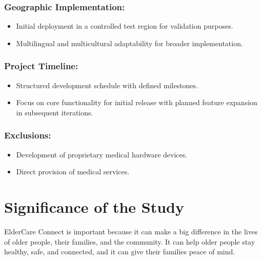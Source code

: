\subsubsection*{Geographic Implementation:}
\begin{itemize}
    \item Initial deployment in a controlled test region for validation purposes.
    \item Multilingual and multicultural adaptability for broader implementation.
\end{itemize}

\subsubsection*{Project Timeline:}
\begin{itemize}
    \item Structured development schedule with defined milestones.
    \item Focus on core functionality for initial release with planned feature expansion in subsequent iterations.
\end{itemize}

\subsubsection*{Exclusions:}
\begin{itemize}
    \item Development of proprietary medical hardware devices.
    \item Direct provision of medical services.
\end{itemize}
\section{Significance of the Study}
ElderCare Connect is important because it can make a big difference in the lives of older people, their families, and the community. It can help older people stay healthy, safe, and connected, and it can give their families peace of mind.\\

